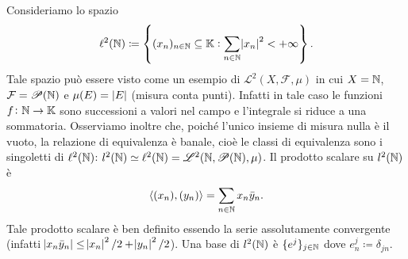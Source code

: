 \begin{example}[spazio $ l^2 $]
    Consideriamo lo spazio
    \[
        \ell^2(\mathbb{N}) \coloneqq \left\{(x_n)_{n \in \mathbb{N}} \subseteq \mathbb{K} : \sum_{n \in \mathbb{N}} \abs{x_n}^2 < +\infty\right\}.
    \]
    Tale spazio può essere visto come un esempio di $ \mathscr{L}^2(X, \mathcal{F}, \mu) $ in cui $ X = \mathbb{N} $, $ \mathcal{F} = \mathscr{P}(\mathbb{N}) $ e $ \mu(E) = \left|E\right| $ (misura conta punti). Infatti in tale caso le funzioni $ f \colon \mathbb{N} \to \mathbb{K} $ sono successioni a valori nel campo e l'integrale si riduce a una sommatoria. Osserviamo inoltre che, poiché l'unico insieme di misura nulla è il vuoto, la relazione di equivalenza è banale, cioè le classi di equivalenza sono i singoletti di $ \ell^2(\mathbb{N}) $: $ l^2(\mathbb{N}) \simeq \ell^2(\mathbb{N}) = \mathscr{L}^2(\mathbb{N}, \mathscr{P}(\mathbb{N}), \mu) $. Il prodotto scalare su $ l^2(\mathbb{N}) $ è
    \[
        {\langle (x_n), (y_n) \rangle} = \sum_{n \in \mathbb{N}} x_n \bar{y}_n.
    \]
    Tale prodotto scalare è ben definito essendo la serie assolutamente convergente (infatti $ \abs{x_n \bar{y}_n} \leq \abs{x_n}^2 /2 + \abs{y_n}^2 /2 $). Una base di $ l^2(\mathbb{N}) $ è $ \{e^j\}_{j \in \mathbb{N}} $ dove $ e^j_n \coloneqq \delta_{jn} $.
\end{example}

